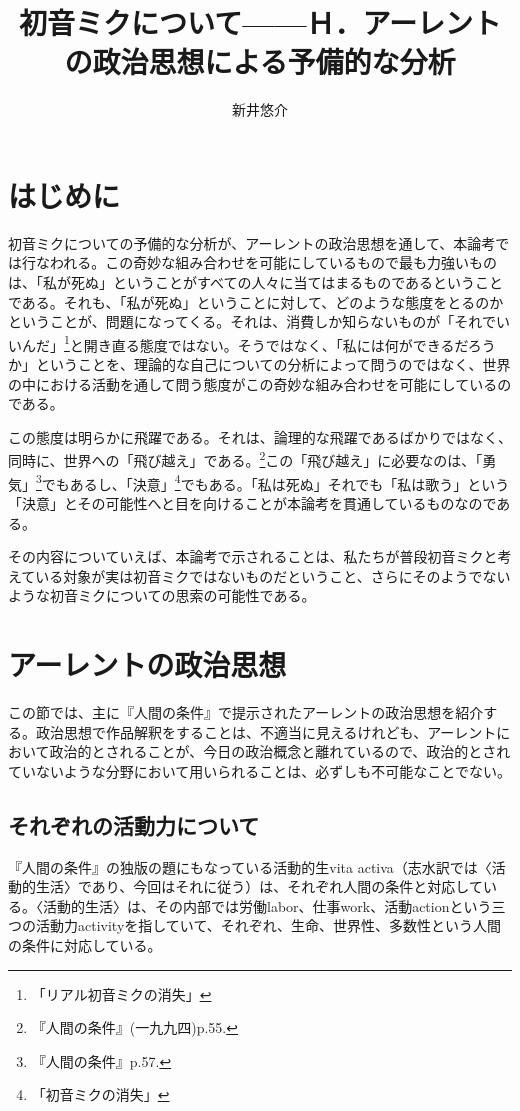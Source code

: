 \documentclass[b5j,twoside,twocolumn]{utarticle}
\title{\tbaselineshift=4pt 初音ミクについて------Ｈ．アーレントの政治思想による予備的な分析}
\author{新井悠介}
\date{\vspace{-5mm}}
\makeatletter
\def\yakuchu{%
\@ifnextchar[\@xfootnote %
{\stepcounter{yakuchu}%
\protected@xdef\@thefnmark{\theyakuchu}%
\@footnotemark\@footnotetext}}
\makeatother
\begin{document}
\maketitle

\setlength{\footskip}{-2mm}
\chead[]{}
\lfoot[]{\thepage{}}
\cfoot[]{}
\rfoot[\thepage{}]{}

\let\yakuchu=\endnote
\renewcommand{\footnoterule}{\noindent\rule{100mm}{0.3mm}\vskip2mm}
\thispagestyle{fancy}
\section*{はじめに}
初音ミクについての予備的な分析が、アーレントの政治思想を通して、本論考では行なわれる。この奇妙な組み合わせを可能にしているもので最も力強いものは、「私が死ぬ」ということがすべての人々に当てはまるものであるということである。それも、「私が死ぬ」ということに対して、どのような態度をとるのかということが、問題になってくる。それは、消費しか知らないものが「それでいいんだ」\footnote{「リアル初音ミクの消失」}と開き直る態度ではない。そうではなく、「私には何ができるだろうか」ということを、理論的な自己についての分析によって問うのではなく、世界の中における活動を通して問う態度がこの奇妙な組み合わせを可能にしているのである。


この態度は明らかに飛躍である。それは、論理的な飛躍であるばかりではなく、同時に、世界への「飛び越え」である。\footnote{『人間の条件』(一九九四)p.55.}この「飛び越え」に必要なのは、「勇気」\footnote{『人間の条件』p.57.}でもあるし、「決意」\footnote{「初音ミクの消失」}でもある。「私は死ぬ」それでも「私は歌う」という「決意」とその可能性へと目を向けることが本論考を貫通しているものなのである。


その内容についていえば、本論考で示されることは、私たちが普段初音ミクと考えている対象が実は初音ミクではないものだということ、さらにそのようでないような初音ミクについての思索の可能性である。
\setcounter{section}{0}
\section{アーレントの政治思想}
この節では、主に『人間の条件』で提示されたアーレントの政治思想を紹介する。政治思想で作品解釈をすることは、不適当に見えるけれども、アーレントにおいて政治的とされることが、今日の政治概念と離れているので、政治的とされていないような分野において用いられることは、必ずしも不可能なことでない。


\subsection{それぞれの活動力について}
『人間の条件』の独版の題にもなっている活動的生vita activa（志水訳では〈活動的生活〉であり、今回はそれに従う）は、それぞれ人間の条件と対応している。〈活動的生活〉は、その内部では労働labor、仕事work、活動actionという三つの活動力activityを指していて、それぞれ、生命、世界性、多数性という人間の条件に対応している。
\end{document}
